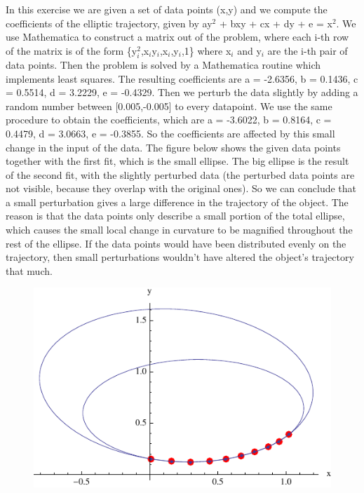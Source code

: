 \documentclass[10pt,a4paper]{article}
\begin{document}
\noindent In this exercise we are given a set of data points (x,y) and we compute the coefficients of the elliptic trajectory, given by ay$^2$ + bxy + cx + dy + e = x$^2$. We use Mathematica to construct a matrix out of the problem, where each i-th row of the matrix is of the form \{y$_{i}^{2}$,x$_{i}$y$_{i}$,x$_{i}$,y$_{i}$,1\} where x$_{i}$ and y$_{i}$ are the i-th pair of data points. Then the problem is solved by a Mathematica routine which implements least squares. The resulting coefficients are a = -2.6356, b = 0.1436, c = 0.5514, d = 3.2229, e = -0.4329. Then we perturb the data slightly by adding a random number between [0.005,-0.005] to every datapoint. We use the same procedure to obtain the coefficients, which are a = -3.6022, b = 0.8164, c = 0.4479, d = 3.0663, e = -0.3855. So the coefficients are affected by this small change in the input of the data. The figure below shows the given data points together with the first fit, which is the small ellipse. The big ellipse is the result of the second fit, with the slightly perturbed data (the perturbed data points are not visible, because they overlap with the original ones). So we can conclude that a small perturbation gives a large difference in the trajectory of the object. The reason is that the data points only describe a small portion of the total ellipse, which causes the small local change in curvature to be magnified throughout the rest of the ellipse. If the data points would have been distributed evenly on the trajectory, then small perturbations wouldn't have altered the object's trajectory that much.

\begin{figure}[H]
\centering
\includegraphics[scale=1.5]{3_5.pdf}
\end{figure}
\end{document}
